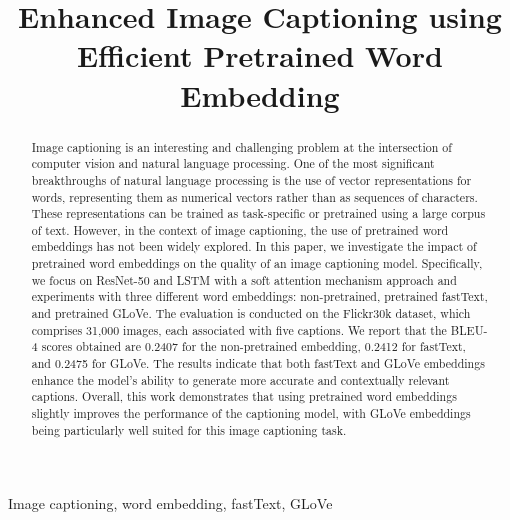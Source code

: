\documentclass[conference]{IEEEtran}
\begin{document}
\title{Enhanced Image Captioning using\\Efficient Pretrained Word Embedding\\}
\author{
}
\maketitle

\begin{abstract}
Image captioning is an interesting and challenging problem at the intersection of computer vision and natural language processing.
One of the most significant breakthroughs of natural language processing is the use of vector representations for words, representing them as numerical vectors rather than as sequences of characters. These representations can be trained as task-specific or pretrained using a large corpus of text. However, in the context of image captioning, the use of pretrained word embeddings has not been widely explored.
In this paper, we investigate the impact of pretrained word embeddings on the quality of an image captioning model. Specifically, we focus on ResNet-50 and LSTM with a soft attention mechanism approach and experiments with three different word embeddings: non-pretrained, pretrained fastText, and pretrained GLoVe. The evaluation is conducted on the Flickr30k dataset, which comprises 31,000 images, each associated with five captions.
We report that the BLEU-4 scores obtained are 0.2407 for the non-pretrained embedding, 0.2412 for fastText, and 0.2475 for GLoVe. The results indicate that both fastText and GLoVe embeddings enhance the model's ability to generate more accurate and contextually relevant captions. Overall, this work demonstrates that using pretrained word embeddings slightly improves the performance of the captioning model, with GLoVe embeddings being particularly well suited for this image captioning task.
\end{abstract} 

\begin{IEEEkeywords}
Image captioning, word embedding, fastText, GLoVe
\end{IEEEkeywords}
\end{document}
